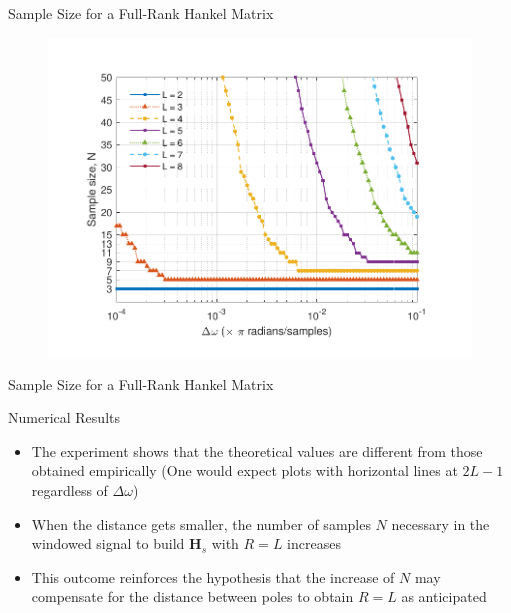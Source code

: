 \documentclass{beamer}
\begin{document}
	\begin{frame}{Sample Size for a Full-Rank Hankel Matrix}
        
        \vspace{-20pt}

        \begin{figure}[!ht]
			\centering
			\includegraphics[scale=0.75]{fig/SBRT2021/poles_proximity-PoleDistance_vs_Samples-2021-05-14.pdf}
		\end{figure}

	\end{frame}
	
	\begin{frame}{Sample Size for a Full-Rank Hankel Matrix}
        
        \begin{block}{Numerical Results}
            \begin{itemize}
                \item The experiment shows that the theoretical values are different from those obtained empirically (One would expect plots with horizontal lines at $2L - 1$ regardless of $\Delta \omega$)
                \item When the distance gets smaller, the number of samples $N$ necessary in the windowed signal to build ${\mathbf{H}}_s$ with $R=L$ increases
                \item This outcome reinforces the hypothesis that the increase of $N$ may compensate for the distance between poles to obtain $R=L$ as anticipated
        	\end{itemize}
        \end{block}

	\end{frame}
\end{document}
